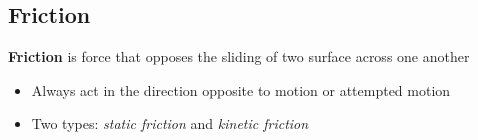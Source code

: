 
\subsection{Friction}
\textbf{Friction} is force that opposes the sliding of two surface across one
another
\begin{itemize}
\item Always act in the direction opposite to motion or attempted motion
\item Two types: \emph{static friction} and \emph{kinetic friction}
\end{itemize}  


